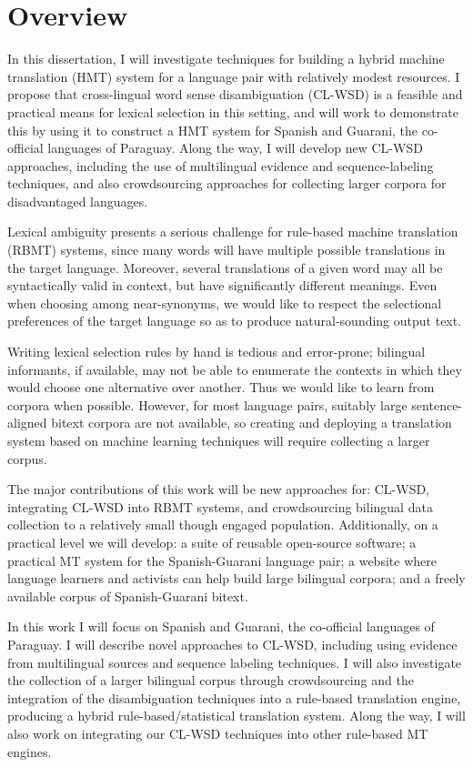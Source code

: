 \section{Overview}
In this dissertation, I will investigate techniques for building a hybrid
machine translation (HMT) system for a language pair with relatively modest
resources.
I propose that cross-lingual word sense disambiguation (CL-WSD) is a feasible
and practical means for lexical selection in this setting, and will work to
demonstrate this by using it to construct a HMT system for Spanish and Guarani,
the co-official languages of Paraguay.
Along the way, I will develop new CL-WSD approaches, including the use of
multilingual evidence and sequence-labeling techniques, and also crowdsourcing
approaches for collecting larger corpora for disadvantaged languages.

Lexical ambiguity presents a serious challenge for rule-based machine
translation (RBMT) systems, since many words will have multiple possible
translations in the target language. Moreover, several translations of a given
word may all be syntactically valid in context, but have significantly
different meanings. Even when choosing among near-synonyms, we would like to
respect the selectional preferences of the target language so as to produce
natural-sounding output text.

Writing lexical selection rules by hand is tedious and error-prone; bilingual
informants, if available, may not be able to enumerate the contexts in which
they would choose one alternative over another. Thus we would like to learn
from corpora when possible. However, for most language pairs, suitably large
sentence-aligned bitext corpora are not available, so creating and deploying a
translation system based on machine learning techniques will require collecting
a larger corpus.

The major contributions of this work will be new approaches for: CL-WSD,
integrating CL-WSD into RBMT systems, and crowdsourcing bilingual data
collection to a relatively small though engaged population.
Additionally, on a practical level we will develop: a suite of reusable
open-source software; a practical MT system for the Spanish-Guarani language
pair; a website where language learners and activists can help build large
bilingual corpora; and a freely available corpus of Spanish-Guarani bitext.

In this work I will focus on Spanish and Guarani, the co-official languages of
Paraguay. I will describe novel approaches to CL-WSD, including using evidence
from multilingual sources and sequence labeling techniques.  I will also
investigate the collection of a larger bilingual corpus through crowdsourcing
and the integration of the disambiguation techniques into a rule-based
translation engine, producing a hybrid rule-based/statistical translation
system. Along the way, I will also work on integrating our CL-WSD techniques
into other rule-based MT engines.

